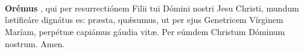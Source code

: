 \\[1mm]
\\[1mm]
\\[2mm]
\textbf{Orémus}
, qui per resurrectiónem Filii tui Dómini nostri Jesu Christi,
mundum l{\ae}tificáre dignátus es: pr{\ae}sta, qu{\'\ae}sumus, ut per ejus Genetricem Vírginem Maríam,
perpétu{\ae} capiámus gáudia vit{\ae}. Per eúmdem Christum Dóminum nostrum. Amen.